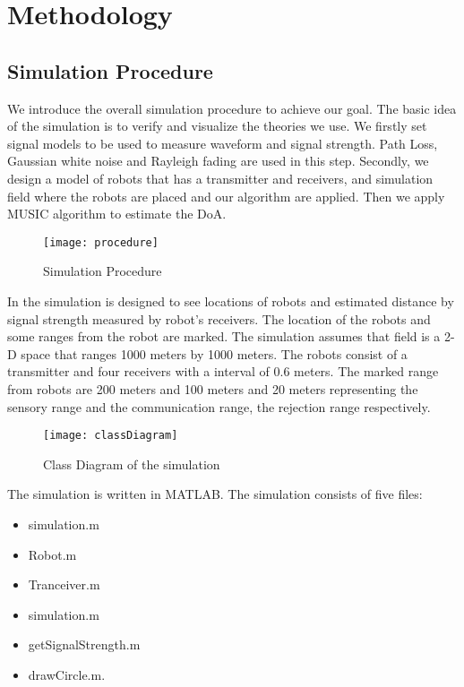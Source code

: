 \section{Methodology}
\subsection{Simulation Procedure}
We introduce the overall simulation procedure to achieve our goal. The basic idea of the simulation is to verify and visualize the theories we use. We firstly set signal models to be used to measure waveform and signal strength. Path Loss, Gaussian white noise and Rayleigh fading are used in this step. Secondly, we design a model of robots that has a transmitter and receivers, and simulation field where the robots are placed and our algorithm are applied. Then we apply MUSIC algorithm to estimate the DoA.


\begin{figure}[ht]
	\centering
	\texttt{[image: procedure]}
	\caption{Simulation Procedure}
	\end{figure}
	
In the simulation is designed to see locations of robots and estimated distance by signal strength measured by robot's receivers. The location of the robots and some ranges from the robot are marked. The simulation assumes that field is a 2-D space that ranges 1000 meters by 1000 meters. The robots consist of a transmitter and four receivers with a interval of 0.6 meters. The marked range from robots are 200 meters and 100 meters and 20 meters representing the sensory range and the communication range, the rejection range respectively.



\begin{figure}[ht]
	\centering
	\texttt{[image: classDiagram]}
	\caption{Class Diagram of the simulation}
	\end{figure}
	

The simulation is written in MATLAB. The simulation consists of five files: 
\begin{itemize}
	\item simulation.m
	\item Robot.m
	\item Tranceiver.m
	\item simulation.m
	\item getSignalStrength.m
	\item drawCircle.m.
\end{itemize}

